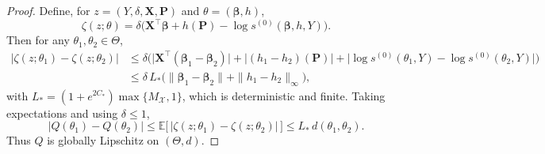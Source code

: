 \documentclass[10pt,a4paper]{amsart}
\begin{document}
\begin{proof}
    Define, for $z=(Y,\delta,\bm X,\bm P)$ and $\theta=(\bm\beta,h)$,
    \[
    \zeta(z;\theta)=\delta\Big(\bm X^\top\bm\beta+h(\bm P)-\log s^{(0)}(\bm\beta,h,Y)\Big).
    \]
    Then for any $\theta_1,\theta_2\in\Theta$,
    \[
    \begin{aligned}
    \big|\zeta(z;\theta_1)-\zeta(z;\theta_2)\big|
    &\le \delta\Big(\big|\bm X^\top(\bm\beta_1-\bm\beta_2)\big|+\big|(h_1-h_2)(\bm P)\big|
    +\big|\log s^{(0)}(\theta_1,Y)-\log s^{(0)}(\theta_2,Y)\big|\Big)\\
    &\le \delta\,L_*\Big(\|\bm\beta_1-\bm\beta_2\|+\|h_1-h_2\|_\infty\Big),
    \end{aligned}
    \]
    with $L_*=(1+e^{2C_*})\max\{M_{\mathcal X},1\}$, which is deterministic and finite.
    Taking expectations and using $\delta\le 1$,
    \[
    |Q(\theta_1)-Q(\theta_2)|
    \le \mathbb E\big[\,|\zeta(z;\theta_1)-\zeta(z;\theta_2)|\,\big]
    \le L_*\,d(\theta_1,\theta_2).
    \]
    Thus $Q$ is globally Lipschitz on $(\Theta,d)$.
    \end{proof}
\end{document}

